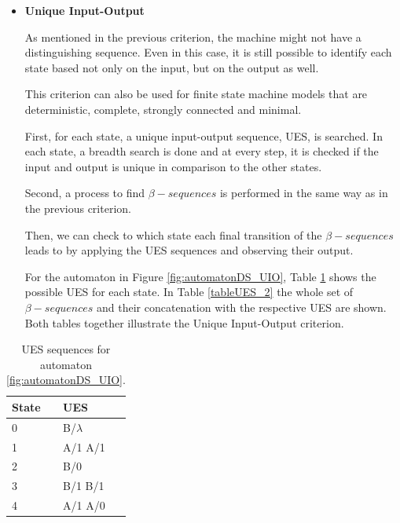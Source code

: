 \begin{itemize}
\item \textbf{Unique Input-Output}

As mentioned in the previous criterion, the machine might not have a distinguishing sequence. Even in this case, it is still possible to identify each state based not only on the input, but on the output as well.

This criterion can also be used for finite state machine models that are deterministic, complete, strongly connected and minimal. 

First, for each state, a unique input-output sequence, UES, is searched. In each state, a breadth search is done and at every step, it is checked if the input and output is unique in comparison to the other states.

Second, a process to find $\beta-sequences$ is performed in the same way as in the previous criterion.

Then, we can check to which state each final transition of the $\beta-sequences$ leads to by applying the UES sequences and observing their output.

For the automaton in Figure \ref{fig:automatonDS_UIO}, Table \ref{tableUES_1} shows the possible UES for each state. In Table \ref{tableUES_2} the whole set of $\beta-sequences$ and their concatenation with the respective UES are shown. Both tables together illustrate the Unique Input-Output criterion.

\end{itemize}

\begin{table}
\begin{center}
\begin{tabular}{| l | l|}

\hline

State & UES \\ \hline

0 & B/$\lambda$\\ \hline
1 & A/1 A/1\\ \hline
2 & B/0\\ \hline
3 & B/1 B/1\\ \hline
4 & A/1 A/0\\

\hline
\end{tabular}
\end{center}
\caption{UES sequences for automaton \ref{fig:automatonDS_UIO}.\cite{inpe10}}
\label{tableUES_1}
\end{table}


